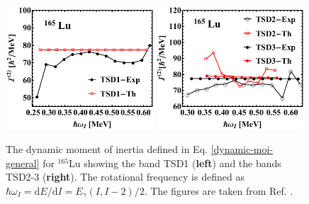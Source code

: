 \begin{figure}
    \centering
    \includegraphics[width=0.49\textwidth]{Chapters/Figures/Lu-exp-energies/fig17a_lu165.pdf}
    \includegraphics[width=0.49\textwidth]{Chapters/Figures/Lu-exp-energies/fig17b_lu165.pdf}
    \caption{The dynamic moment of inertia defined in Eq. \ref{dynamic-moi-general} for $^{165}$Lu showing the band TSD1 (\textbf{left}) and the bands TSD2-3 (\textbf{right}). The rotational frequency is defined as $\hbar\omega_I=\text{d}E/\text{d}I=E_\gamma(I,I-2)/2$. The figures are taken from Ref. \cite{raduta2020approach}.}
    \label{dynamic-moi-Lu-165}
\end{figure}

